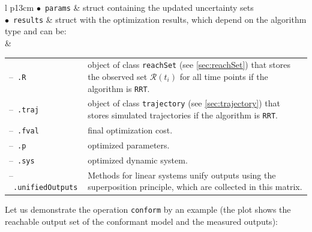 \begin{center}
\renewcommand{\arraystretch}{1.3}
\begin{tabular}[t]{l p{13cm} }
    $\bullet$~\texttt{params} & struct containing the updated uncertainty sets \\
	$\bullet$~\texttt{results} & struct with the optimization results, which depend on the algorithm type and can be: \\
	& \begin{tabular}[t]{l p{10cm}}
		--~\texttt{.R} & object of class \texttt{reachSet} (see \cref{sec:reachSet}) that stores the observed set $\mathcal{R}(t_i)$ for all time points if the algorithm is \texttt{RRT}.\\
		--~\texttt{.traj} & object of class \texttt{trajectory} (see \cref{sec:trajectory}) that stores simulated trajectories if the algorithm is \texttt{RRT}.\\
		--~\texttt{.fval} & final optimization cost. \\
		--~\texttt{.p} & optimized parameters. \\
		--~\texttt{.sys} & optimized dynamic system. \\
		--~\texttt{.unifiedOutputs} & Methods for linear systems unify outputs using the superposition principle, which are collected in this matrix.
	\end{tabular}
\end{tabular}
\end{center}


Let us demonstrate the operation \texttt{conform} by an example (the plot shows the reachable output set of the conformant model and the measured outputs): 

\begin{center}
\begin{minipage}[t]{\textwidth}
	\footnotesize
	
\end{minipage}
\begin{minipage}[t]{\textwidth}
	\vspace{0pt}
	\centering
\end{minipage}
\end{center}
